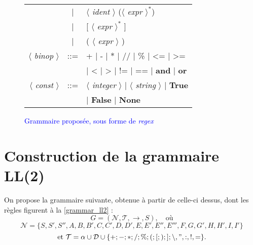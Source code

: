 \documentclass[a4paper, 12pt]{report}
\begin{document}
\begin{figure}[!h]
\begin{center}
{\begin{tabular}{rcl}
& | & $\langle$ \textit{ident} $\rangle$ ($\langle$ \textit{expr} $\rangle^*$)\\
& | & [ $\langle$ \textit{expr} $\rangle^*$ ]\\
& | & ( $\langle$ \textit{expr} $\rangle$ )\\
$\langle$ \textit{binop} $\rangle$ & ::= &+ | - | * | // | \% | <= | >= \\
&&| < | > | != | == | \textbf{and} | \textbf{or} \\
$\langle$ \textit{const} $\rangle$ & ::= & $\langle$ \textit{integer} $\rangle$ | $\langle$ \textit{string} $\rangle$ | \textbf{True}\\
&& | \textbf{False} | \textbf{None}
\end{tabular}
}
\caption{\textcolor{blue}{Grammaire proposée, sous forme de \textit{regex}}}
\label{grammar_with_regex}
\end{center}\end{figure}

\section{Construction de la grammaire LL(2)}

On propose la grammaire suivante, obtenue à partir de celle-ci dessus, dont les règles figurent à la \figurename \space \ref{grammar_ll2} :
\[ G = ( \mathcal{N}, \mathcal{T}, \to, S), \quad \text{où}\]
\[  \mathcal{N} = \lbrace S,S',S'',A,B,B',C,C',D,D',E,E',E'',E''',F,G,G',H,H',I,I' \rbrace \]
\[ \text{et } \mathcal{T} = \alpha \cup \mathcal{D} \cup \lbrace +;-;*;/;\%;(;[;);];\backslash, ",:,!,=\rbrace.\]
\end{document}
